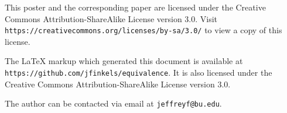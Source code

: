\newcommand{\url}[1]{\texttt{#1}}
\newcommand{\email}[1]{\texttt{#1}}

This poster and the corresponding paper are licensed under the Creative Commons Attribution-ShareAlike License version 3.0.
Visit \mbox{\url{https://creativecommons.org/licenses/by-sa/3.0/}} to view a copy of this license.

The \LaTeX{} markup which generated this document is available at \mbox{\url{https://github.com/jfinkels/equivalence}}.
It is also licensed under the Creative Commons Attribution-ShareAlike License version 3.0.

The author can be contacted via email at \email{jeffreyf@bu.edu}.

